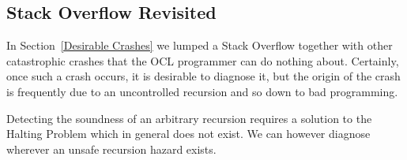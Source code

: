 \documentclass[
]{ceurart}
\begin{document}







\subsection{Stack Overflow Revisited}\label{Stack Overflow Revisited}

In Section~\ref{Desirable Crashes} we lumped a Stack Overflow together with other catastrophic crashes that the OCL programmer can do nothing about. Certainly, once such a crash occurs, it is desirable to diagnose it, but the origin of the crash is frequently due to an uncontrolled recursion and so down to bad programming.

Detecting the soundness of an arbitrary recursion requires a solution to the Halting Problem which in general does not exist. We can however diagnose wherever an unsafe recursion hazard exists.
\end{document}
